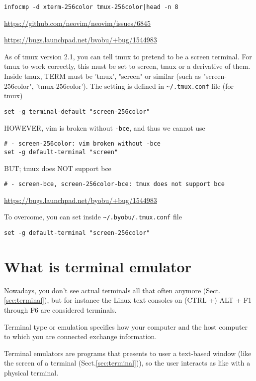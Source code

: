 \begin{verbatim}
infocmp -d xterm-256color tmux-256color|head -n 8
\end{verbatim}
\url{https://github.com/neovim/neovim/issues/6845}

\url{https://bugs.launchpad.net/byobu/+bug/1544983}

As of tmux version 2.1, you can tell tmux to pretend to be a screen terminal.
For tmux to work correctly, this must be set to screen, tmux or a derivative of
them. Inside tmux, TERM must be 'tmux', "screen" or similar (such as
"screen-256color", 'tmux-256color'). The setting is defined in
\verb!~/.tmux.conf! file (for tmux)
\begin{verbatim}
set -g terminal-default "screen-256color"
\end{verbatim}


HOWEVER, vim is broken without \verb!-bce!, and thus we cannot use
\begin{verbatim}
# - screen-256color: vim broken without -bce
set -g default-terminal "screen"
\end{verbatim}
BUT; tmux does NOT support bce 
\begin{verbatim}
# - screen-bce, screen-256color-bce: tmux does not support bce
\end{verbatim}
\url{https://bugs.launchpad.net/byobu/+bug/1544983}

To overcome, you can set inside \verb!~/.byobu/.tmux.conf! file
\begin{verbatim}
set -g default-terminal "screen-256color"
\end{verbatim}


\section{What is terminal emulator}
\label{sec:terminal-emulators}

Nowadays, you don't see actual terminals all that often anymore
(Sect.\ref{sec:terminal}), but for instance the Linux text consoles on (CTRL +)
ALT + F1 through F6 are considered terminals.


Terminal type or emulation  specifies how your computer and the host computer to
which you are connected exchange information. 

Terminal emulators are programs that presents to user a text-based window (like
the screen of a terminal (Sect.\ref{sec:terminal})), so the user interacts as
like with a physical terminal. 


